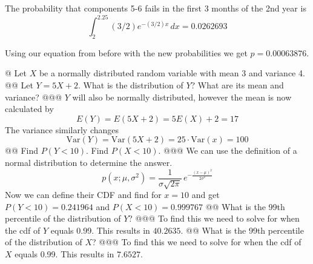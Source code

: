\documentclass[10pt]{article}
\begin{document}
\begin{easylist}[enumerate]
    The probability that components 5-6 fails in the first 3 months of the 2nd year is
    \[
        \int^{2.25}_2 (3/2)e^{-(3/2)x} \, dx = 0.0262693
    \]

    Using our equation from before with the new probabilities we get $p=\boxed{0.00063876}$.

    @ Let $X$ be a normally distributed random variable with mean 3 and variance 4.
    @@ Let $Y = 5X + 2$. What is the distribution of $Y$? What are its mean and variance?
    @@@ $Y$ will also be normally distributed, however the mean is now calculated by
    \[ E(Y) = E(5X+2) = 5 E(X) + 2 = 17 \]
    The variance similarly changes
    \[ \text{Var}(Y) = \text{Var}(5X+2) = 25 \cdot \text{Var}(x) = 100 \]
    @@ Find $P(Y < 10)$. Find $P(X < 10)$.
    @@@ We can use the definition of a normal distribution to determine the answer.
    \[ p(x;\mu, \sigma^2) = \frac{1}{\sigma\sqrt{2\pi} }\, e^{-\frac{(x - \mu)^2}{2 \sigma^2} } \]
    Now we can define their CDF and find for $x=10$ and get $P(Y < 10) = 0.241964$ and $P(X < 10)=0.999767$
    @@ What is the 99th percentile of the distribution of $Y$?
    @@@ To find this we need to solve for when the cdf of $Y$ equals 0.99. This results in $40.2635$.
    @@ What is the 99th percentile of the distribution of $X$?
    @@@ To find this we need to solve for when the cdf of $X$ equals 0.99. This results in $7.6527$.


\end{easylist}
\end{document}
